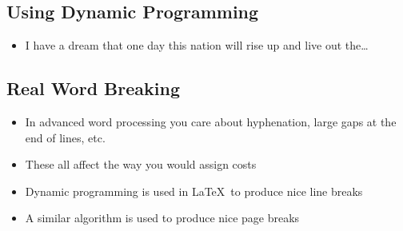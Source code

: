 
\begin{slide}
\section{Using Dynamic Programming}

\pb
\begin{itemize} \small
\item I have a dream that one day this nation will rise up and live out
  the\ldots \pause
\end{itemize}
\begin{center}
  \pause
\end{center}
\end{slide}


\begin{slide}
\section{Real Word Breaking}

\begin{PauseHighLight}
  \begin{itemize}
  \item In advanced word processing you care about hyphenation, large
    gaps at the end of lines, etc.\pause
  \item These all affect the way you would assign costs\pause
  \item Dynamic programming is used in \LaTeX\ to produce nice line
    breaks\pause
  \item A similar algorithm is used to produce nice page breaks\pause
  \end{itemize}
\end{PauseHighLight}

\end{slide}


